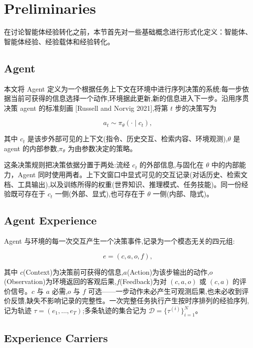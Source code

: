 \section{Preliminaries}
\label{sec:prelim}

在讨论智能体经验转化之前，本节首先对一些基础概念进行形式化定义：智能体、智能体经验、经验载体和经验转化。

\subsection{Agent}
\label{sec:agent}

本文将 Agent 定义为一个根据任务上下文在环境中进行序列决策的系统:每一步依据当前可获得的信息选择一个动作,环境据此更新,新的信息进入下一步。沿用序贯决策 agent 的标准刻画 [Russell and Norvig 2021],将第 $t$ 步的决策写为

$$a_t \sim \pi_\theta(\cdot \mid c_t),$$

其中 $c_t$ 是该步外部可见的上下文(指令、历史交互、检索内容、环境观测),$\theta$ 是 agent 的内部参数,$\pi_\theta$ 为由参数决定的策略。

这条决策规则把决策依据分置于两处:流经 $c_t$ 的外部信息,与固化在 $\theta$ 中的内部能力，Agent 同时使用两者。上下文窗口中显式可见的交互记录(对话历史、检索文档、工具输出),以及训练所得的权重(世界知识、推理模式、任务技能)。同一份经验既可存在于 $c_t$ 一侧(外部、显式),也可存在于 $\theta$ 一侧(内部、隐式)。

\subsection{Agent Experience}
\label{sec:agent_exp}

Agent 与环境的每一次交互产生一个决策事件,记录为一个模态无关的四元组:

$$e = (c, a, o, f),$$

其中 $c$(Context)为决策前可获得的信息,$a$(Action)为该步输出的动作,$o$(Observation)为环境返回的客观后果,$f$(Feedback)为对 $(c,a,o)$ 或 $(c,a)$ 的评价信号。$c$ 与 $a$ 必需,$o$ 与 $f$ 可选——一步动作未必产生可观测后果,也未必收到评价反馈,缺失不影响记录的完整性。一次完整任务执行产生按时序排列的经验序列,记为轨迹 $\tau = (e_1, \dots, e_T)$;多条轨迹的集合记为 $\mathcal{D} = \{\tau^{(i)}\}_{i=1}^N$。




\subsection{Experience Carriers}
\label{sec:carriers}

